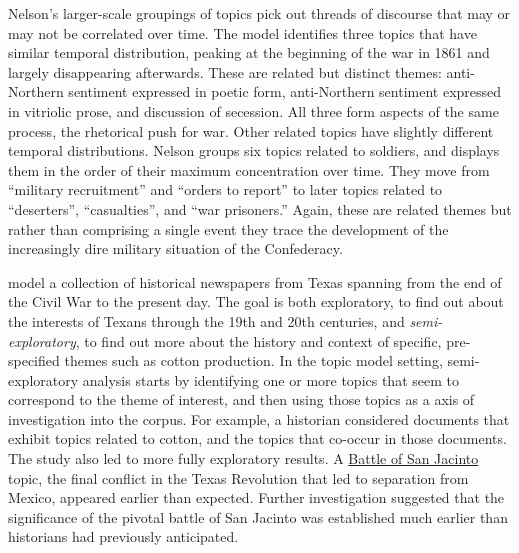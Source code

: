 Nelson's larger-scale groupings of topics pick out threads of discourse that may or may not be correlated over time.
The model identifies three topics that have similar temporal distribution, peaking at the beginning of the war in 1861 and largely disappearing afterwards.
These are related but distinct themes: anti-Northern sentiment expressed in poetic form, anti-Northern sentiment expressed in vitriolic prose, and discussion of secession.
All three form aspects of the same process, the rhetorical push for war.
Other related topics have slightly different temporal distributions.
Nelson groups six topics related to soldiers, and displays them in the order of their maximum concentration over time.
They move from ``military recruitment'' and ``orders to report'' to later topics related to ``deserters'', ``casualties'', and ``war prisoners.''
Again, these are related themes but rather than comprising a single event they trace the development of the increasingly dire military situation of the Confederacy.

\citet{yang-11-historical} model a collection of historical newspapers from Texas spanning from the end of the Civil War to the present day.
The goal is both exploratory, to find out about the interests of Texans through the 19th and 20th centuries, and {\em semi-exploratory}, to find out more about the history and context of specific, pre-specified themes such as cotton production.
In the topic model setting, semi-exploratory analysis starts by identifying one or more topics that seem to correspond to the theme of interest, and then using those topics as a axis of investigation into the corpus.
For example, a historian considered documents that exhibit topics related to cotton, and the topics that co-occur in those documents.
The study also led to more fully exploratory results.
A \underline{Battle of San Jacinto} topic, the final conflict in the Texas Revolution that led to separation from Mexico, appeared earlier than expected.
Further investigation suggested that the significance of the pivotal battle of San Jacinto was established much earlier than historians had previously anticipated.

